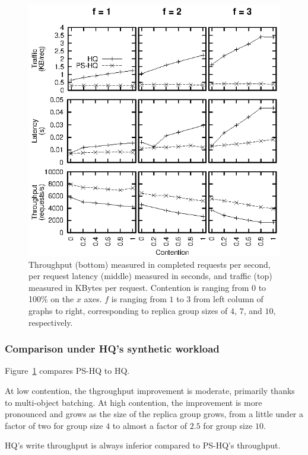 \documentclass[twocolumn,10pt]{article}
\begin{document}
\begin{figure}
\centering
\includegraphics{graphs/ps-hq}
\caption{Throughput (bottom) measured in completed requests per second,
  per request latency (middle) measured in seconds, and traffic
  (top) measured in KBytes per request.   Contention is ranging from 0
  to 100\% on the $x$ axes. $f$ is ranging from $1$ to $3$ from left
  column of graphs to right, corresponding to replica group sizes of
  $4$, $7$, and $10$, respectively.}
\label{fig:ps-hq}
\end{figure}

\subsubsection{Comparison under HQ's synthetic workload}

Figure~\ref{fig:ps-hq} compares PS-HQ to HQ.

At low contention, the thgroughput improvement is moderate, primarily
thanks to multi-object batching.  At high contention, the improvement is
more pronounced and grows as the size of the replica group grows, from a
little under a factor of two for group size $4$ to almost a factor of
$2.5$ for group size $10$.

HQ's write throughput is always inferior compared to PS-HQ's
throughput.  
\end{document}
